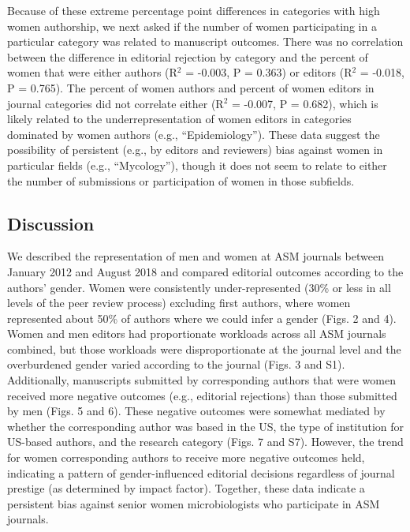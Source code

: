 \documentclass[11pt,]{article}
\begin{document}
Because of these extreme percentage point differences in categories with
high women authorship, we next asked if the number of women
participating in a particular category was related to manuscript
outcomes. There was no correlation between the difference in editorial
rejection by category and the percent of women that were either authors
(R\({^2}\) = -0.003, P = 0.363) or editors (R\({^2}\) = -0.018, P =
0.765). The percent of women authors and percent of women editors in
journal categories did not correlate either (R\({^2}\) = -0.007, P =
0.682), which is likely related to the underrepresentation of women
editors in categories dominated by women authors (e.g.,
``Epidemiology''). These data suggest the possibility of persistent
(e.g., by editors and reviewers) bias against women in particular fields
(e.g., ``Mycology''), though it does not seem to relate to either the
number of submissions or participation of women in those subfields.

\subsection{Discussion}\label{discussion}

We described the representation of men and women at ASM journals between
January 2012 and August 2018 and compared editorial outcomes according
to the authors' gender. Women were consistently under-represented (30\%
or less in all levels of the peer review process) excluding first
authors, where women represented about 50\% of authors where we could
infer a gender (Figs. 2 and 4). Women and men editors had proportionate
workloads across all ASM journals combined, but those workloads were
disproportionate at the journal level and the overburdened gender varied
according to the journal (Figs. 3 and S1). Additionally, manuscripts
submitted by corresponding authors that were women received more
negative outcomes (e.g., editorial rejections) than those submitted by
men (Figs. 5 and 6). These negative outcomes were somewhat mediated by
whether the corresponding author was based in the US, the type of
institution for US-based authors, and the research category (Figs. 7 and
S7). However, the trend for women corresponding authors to receive more
negative outcomes held, indicating a pattern of gender-influenced
editorial decisions regardless of journal prestige (as determined by
impact factor). Together, these data indicate a persistent bias against
senior women microbiologists who participate in ASM journals.
\end{document}
